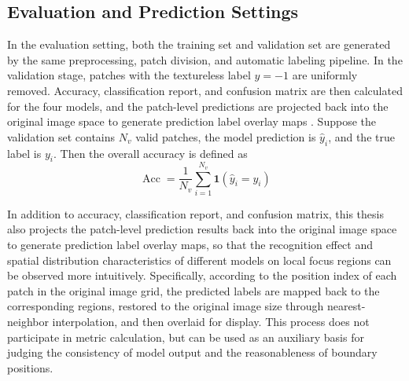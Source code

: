 \subsection{Evaluation and Prediction Settings}
\par In the evaluation setting, both the training set and validation set are
generated by the same preprocessing, patch division, and automatic labeling
pipeline. In the validation stage, patches with the textureless label $y=-1$
are uniformly removed. Accuracy, classification report, and confusion matrix
\cite{schutze2008introduction} are then calculated for the four models, and the
patch-level predictions are projected back into the original image space to
generate prediction label overlay maps
\cite{Long_2015_CVPR,Zhou_2016_CVPR}. Suppose the validation set contains
$N_v$ valid patches, the model prediction is $\hat{y}_i$, and the true label
is $y_i$. Then the overall accuracy is defined as
\begin{equation}
    \operatorname{Acc}=\frac{1}{N_v}\sum_{i=1}^{N_v}\mathbf{1}(\hat{y}_i=y_i)
    \label{eq:accuracy-method}
\end{equation}
\par In addition to accuracy, classification report, and confusion matrix, this
thesis also projects the patch-level prediction results back into the original
image space to generate prediction label overlay maps, so that the recognition
effect and spatial distribution characteristics of different models on local
focus regions can be observed more intuitively. Specifically, according to the
position index of each patch in the original image grid, the predicted labels
are mapped back to the corresponding regions, restored to the original image
size through nearest-neighbor interpolation, and then overlaid for display.
This process does not participate in metric calculation, but can be used as an
auxiliary basis for judging the consistency of model output and the
reasonableness of boundary positions.

